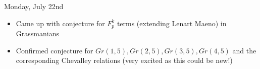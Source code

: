 Monday, July 22nd
\begin{itemize}
    \item Came up with conjecture for $F_p^k$ terms (extending Lenart Maeno) in Grassmanians
    \item Confirmed conjecture for $Gr(1, 5), Gr(2, 5), Gr(3, 5), Gr(4, 5)$ and the corresponding Chevalley relations (very excited as this could be new!)
\end{itemize}